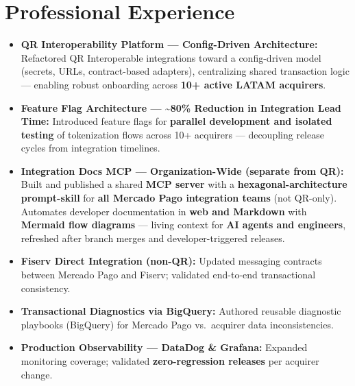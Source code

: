 \section*{Professional Experience}


\begin{itemize}
  \item \textbf{QR Interoperability Platform — Config-Driven Architecture:}
        Refactored QR Interoperable integrations toward a config-driven model (secrets, URLs, contract-based
        adapters), centralizing shared transaction logic — enabling robust onboarding across
        \textbf{10+ active LATAM acquirers}.

  \item \textbf{Feature Flag Architecture — \textasciitilde{}80\% Reduction in Integration Lead Time:}
        Introduced feature flags for \textbf{parallel development and isolated testing} of tokenization
        flows across 10+ acquirers — decoupling release cycles from integration timelines.

  \item \textbf{Integration Docs MCP — Organization-Wide (separate from QR):}
        Built and published a shared \textbf{MCP server} with a \textbf{hexagonal-architecture prompt-skill}
        for \textbf{all Mercado Pago integration teams} (not QR-only). Automates developer documentation
        in \textbf{web and Markdown} with \textbf{Mermaid flow diagrams} — living context for \textbf{AI
        agents and engineers}, refreshed after branch merges and developer-triggered releases.

  \item \textbf{Fiserv Direct Integration (non-QR):}
        Updated messaging contracts between Mercado Pago and Fiserv; validated end-to-end transactional consistency.

  \item \textbf{Transactional Diagnostics via BigQuery:}
        Authored reusable diagnostic playbooks (BigQuery) for Mercado Pago vs.\ acquirer data inconsistencies.

  \item \textbf{Production Observability — DataDog \& Grafana:}
        Expanded monitoring coverage; validated \textbf{zero-regression releases} per acquirer change.
\end{itemize}

